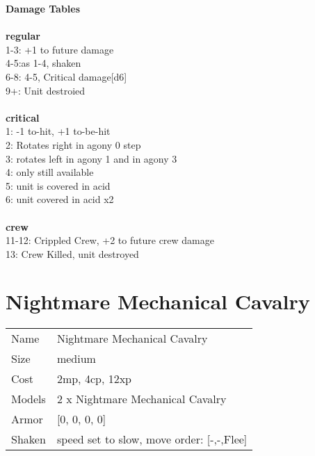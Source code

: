 {\bf Damage Tables} \\
\ \\ {\bf regular } \\
1-3: +1 to future damage \\
4-5:as 1-4, shaken \\
6-8: 4-5, Critical damage[d6] \\
9+: Unit destroied \\
\ \\ {\bf critical } \\
1: -1 to-hit, +1 to-be-hit \\
2: Rotates right in agony 0 step \\
3: rotates left in agony 1 and in agony 3 \\
4: only still available \\
5: unit is covered in acid \\
6: unit covered in acid x2 \\
\ \\ {\bf crew } \\
11-12: Crippled Crew, +2 to future crew damage \\
13: Crew Killed, unit destroyed \\










\pagebreak\pagebreak

\section{ Nightmare Mechanical Cavalry }

\begin{tabular}{ll}
  Name & Nightmare Mechanical Cavalry \\
  Size & medium\\
  Cost & 2mp, 4cp, 12xp\\
  Models & 2 x Nightmare Mechanical Cavalry\\
  Armor & [0, 0, 0, 0]\\
  Shaken & speed set to slow, move order: [-,-,Flee]\\
\end{tabular}

\noindent 

